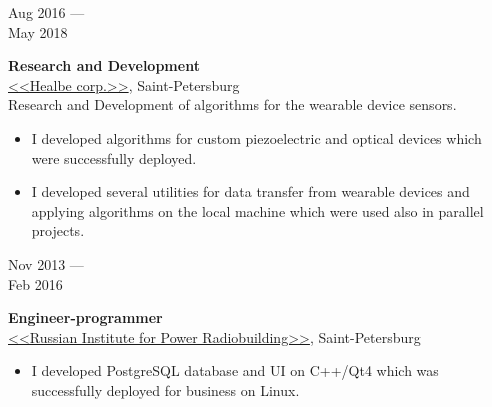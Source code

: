 \documentclass[10pt,a4paper]{article}
\newcommand{\lmpratio}{0.15}
\newcommand{\rmpratio}{0.74}
\newcommand{\vSpace}{0.5cm}
\newcommand{\horizontalSpace}{0.05\textwidth}
\newcommand{\sectionMain}[1]{\textbf{#1}}
\begin{document}
	\begin{minipage}[t]{\lmpratio\textwidth}
		Aug 2016 --- \\May 2018
	\end{minipage}
	\hspace{\horizontalSpace}
	\begin{minipage}[t]{\rmpratio\textwidth}
		\sectionMain{Research and Development}\\
		\href{https://healbe.com/}{<<Healbe corp.>>}, Saint-Petersburg\\[0.1cm]	
  
Research and Development of algorithms for the wearable device sensors.
		\begin{itemize}
                \item 
I developed algorithms for custom piezoelectric and optical devices which were successfully deployed.
                \item 
I developed several utilities for data transfer from wearable devices and applying algorithms on the local machine which were used also in parallel projects.
            \end{itemize}
		 
		
	\end{minipage}	
	\vspace{\vSpace}


        \begin{minipage}[t]{\lmpratio\textwidth}
		Nov 2013 --- \\Feb 2016
	\end{minipage}
	\hspace{\horizontalSpace}
	\begin{minipage}[t]{\rmpratio\textwidth}
		\sectionMain{Engineer-programmer}\\
		\href{http://www.rimr.ru/eng/}{<<Russian Institute for Power Radiobuilding>>}, Saint-Petersburg\\[0.1cm]
            \begin{itemize}
                \item
I developed PostgreSQL database and UI on C++/Qt4 which was successfully deployed for business on Linux.
            \end{itemize}

	\end{minipage}

		\vspace{\vSpace}
	
\end{document}
